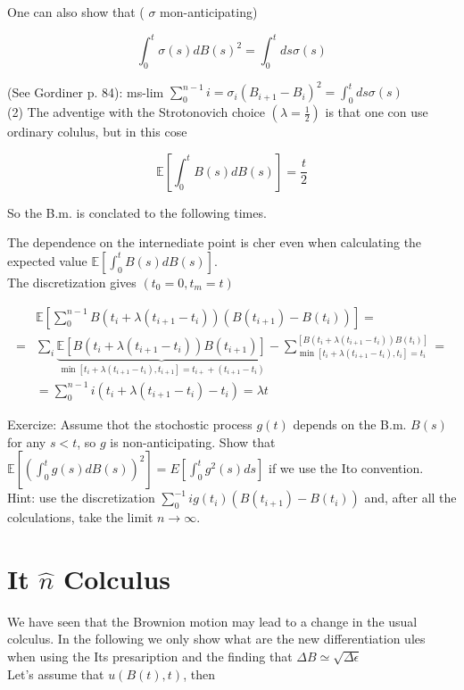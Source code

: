 \documentclass[10pt]{article}
\begin{document}
One can also show that ( $\sigma$ mon-anticipating)

$$
\int_{0}^{t} \sigma(s) d B(s)^{2}=\int_{0}^{t} d s \sigma(s)
$$

(See Gordiner p. 84): ms-lim $\sum_{0}^{n-1} i=\sigma_{i}\left(B_{i+1}-B_{i}\right)^{2}=\int_{0}^{t} d s \sigma(s)$\\
(2) The adventige with the Strotonovich choice $\left(\lambda=\frac{1}{2}\right)$ is that one con use ordinary colulus, but in this cose

$$
\mathbb{E}\left[\int_{0}^{t} B(s) d B(s)\right]=\frac{t}{2}
$$

So the B.m. is conclated to the following times.

The dependence on the internediate point is cher even when calculating the expected value $\mathbb{E}\left[\int_{0}^{t} B(s) d B(s)\right]$.\\
The discretization gives $\left(t_{0}=0, t_{m}=t\right)$

$$
\begin{aligned}
& \mathbb{E}\left[\sum_{0}^{n-1} B\left(t_{i}+\lambda\left(t_{i+1}-t_{i}\right)\right)\left(B\left(t_{i+1}\right)-B\left(t_{i}\right)\right)\right]= \\
= & \sum_{i} \underbrace{\mathbb{E}\left[B\left(t_{i}+\lambda\left(t_{i+1}-t_{i}\right)\right) B\left(t_{i+1}\right)\right]}_{\min \left[t_{i}+\lambda\left(t_{i+1}-t_{i}\right), t_{i+1}\right]=t_{i+}+\left(t_{i+1}-t_{i}\right)}-\sum_{\min \left[t_{i}+\lambda\left(t_{i+1}-t_{i}\right), t_{i}\right]=t_{i}}^{\left[B\left(t_{i}+\lambda\left(t_{i+1}-t_{i}\right)\right) B\left(t_{i}\right)\right]}= \\
& =\sum_{0}^{n-1} i\left(t_{i}+\lambda\left(t_{i+1}-t_{i}\right)-t_{i}\right)=\lambda t
\end{aligned}
$$

Exercize: Assume thot the stochostic process $g(t)$ depends on the B.m. $B(s)$ for any $s<t$, so $g$ is non-anticipating. Show that $\mathbb{E}\left[\left(\int_{0}^{t} g(s) d B(s)\right)^{2}\right]=E\left[\int_{0}^{t} g^{2}(s) d s\right]$ if we use the Ito convention.\\
Hint: use the discretization $\sum_{0}^{-1} i g\left(t_{i}\right)\left(B\left(t_{i+1}\right)-B\left(t_{i}\right)\right)$ and, after all the colculations, take the limit $n \rightarrow \infty$.

\section*{It $\hat{n}$ Colculus}
We have seen that the Brownion motion may lead to a change in the usual colculus. In the following we only show what are the new differentiation ules when using the Its presaription and the finding that $\Delta B \simeq \sqrt{\Delta \epsilon}$\\
Let's assume that $u(B(t), t)$, then
\end{document}
